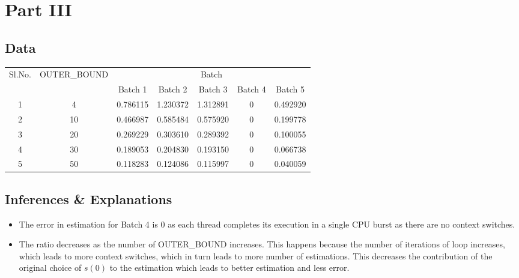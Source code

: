 \documentclass{article}
\begin{document}
\section{Part III}
\subsection{Data}
\begin{center}
    \begin{tabular}{| c | c | c | c | c | c | c |}
    \hline
    \multirow{2}{*}{Sl.No.} & \multirow{2}{*}{OUTER\_BOUND} & \multicolumn{5}{|c|}{Batch}\\ \cline{3-7}
    
     &  & Batch 1 & Batch 2 & Batch 3 & Batch 4 & Batch 5\\ \hline
     1 & 4 & 0.786115 & 1.230372 & 1.312891 & 0 & 0.492920 \\
     2 & 10 & 0.466987 & 0.585484 & 0.575920 & 0 & 0.199778\\
     3 & 20 & 0.269229 & 0.303610 & 0.289392 & 0 & 0.100055\\
     4 & 30 & 0.189053 & 0.204830 & 0.193150 & 0 & 0.066738\\
     5 & 50 & 0.118283 & 0.124086 & 0.115997 & 0 & 0.040059\\
    \hline
    \end{tabular}
\end{center}
\subsection{Inferences \& Explanations}
\begin{itemize}
  \item The error in estimation for Batch 4 is $0$ as each thread completes its execution in a single CPU burst as there are no context switches.
  \item The ratio decreases as the number of OUTER\_BOUND increases. This happens because the number of iterations of loop increases, which leads to more context switches, which in turn leads to more number of estimations. This decreases the contribution of the original choice of $s(0)$ to the estimation which leads to better estimation and less error.
\end{itemize}
\end{document}
